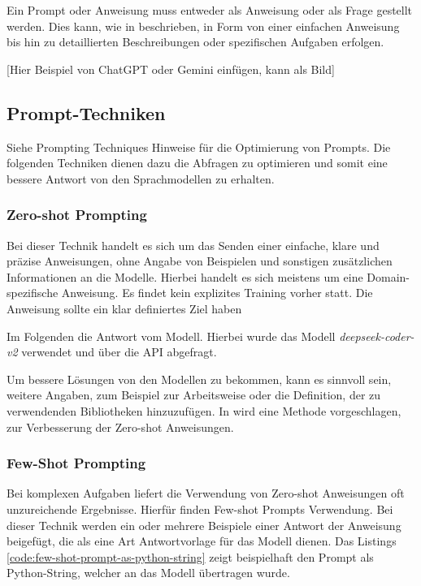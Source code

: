 Ein Prompt oder Anweisung muss entweder als Anweisung oder als Frage gestellt werden. Dies kann, wie in \cite{amatriain-2024} beschrieben, in Form von einer einfachen Anweisung bis hin zu detaillierten Beschreibungen oder spezifischen Aufgaben erfolgen.\vspace{0.2cm}

[Hier Beispiel von ChatGPT oder Gemini einfügen, kann als Bild]


\subsection{Prompt-Techniken}
Siehe Prompting Techniques Hinweise für die Optimierung von Prompts.
Die folgenden Techniken dienen dazu die Abfragen zu optimieren und somit eine bessere Antwort von den Sprachmodellen zu erhalten.


\subsubsection{Zero-shot Prompting}
Bei dieser Technik handelt es sich um das Senden einer einfache, klare und präzise Anweisungen, ohne Angabe von Beispielen und sonstigen zusätzlichen Informationen an die Modelle. Hierbei handelt es sich meistens um eine Domain-spezifische Anweisung. Es findet kein explizites Training vorher statt. Die Anweisung sollte ein klar definiertes Ziel haben\vspace{0.2cm}



Im Folgenden die Antwort vom Modell. Hierbei wurde das Modell \textit{deepseek-coder-v2} verwendet und über die API abgefragt.



Um bessere Lösungen von den Modellen zu bekommen, kann es sinnvoll sein, weitere Angaben, zum Beispiel zur Arbeitsweise oder die Definition, der zu verwendenden Bibliotheken hinzuzufügen. In \cite{wei-2021} wird eine Methode vorgeschlagen, zur Verbesserung der Zero-shot Anweisungen.


\subsubsection{Few-Shot Prompting}
Bei komplexen Aufgaben liefert die Verwendung von Zero-shot Anweisungen oft unzureichende Ergebnisse. Hierfür finden Few-shot Prompts Verwendung. Bei dieser Technik werden ein oder mehrere Beispiele einer Antwort der Anweisung beigefügt, die als eine Art Antwortvorlage für das Modell dienen. Das Listings \ref{code:few-shot-prompt-as-python-string} zeigt beispielhaft den Prompt als Python-String, welcher an das Modell übertragen wurde.\vspace{0.2cm}


